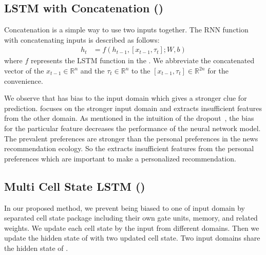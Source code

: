 \subsection{LSTM with Concatenation (\lstmcatname)}
\label{sec:method:lstmcat}
Concatenation is a simple way to use two inputs together.
The RNN function with concatenating inputs is described as follows:
\begin{align*}
	h_t &= f(h_{t-1},[x_{t-1},\tau_t];W,b)
\end{align*}
where $f$ represents the LSTM function in the \lstmcatname.
We abbreviate the concatenated vector of the $x_{t-1} \in \mathbb{R}^{n}$ and the $\tau_t \in \mathbb{R}^{n}$ to the $[x_{t-1},\tau_t] \in \mathbb{R}^{2n}$ for the convenience.

We observe that \lstmcat has bias to the input domain which gives a stronger clue for prediction.
\lstmcat focuses on the stronger input domain and extracts insufficient features from the other domain.
As mentioned in the intuition of the dropout~\cite{Dropout}, the bias for the particular feature decreases the performance of the neural network model.
The prevalent preferences are stronger than the personal preferences in the news recommendation ecology.
So the \lstmcat extracts insufficient features from the personal preferences which are important to make a personalized recommendation.

\subsection{Multi Cell State LSTM (\methodname)}
\label{sec:method:mclstm}
In our proposed method, we prevent \method being biased to one of input domain by separated cell state package including their own gate units, memory, and related weights.
We update each cell state by the input from different domains.
Then we update the hidden state of \method with two updated cell state.
Two input domains share the hidden state of \methodname.

